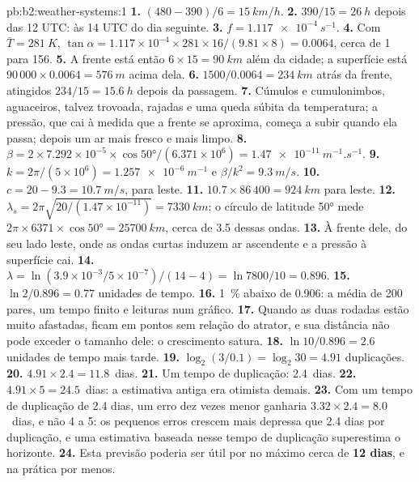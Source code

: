 \begin{solution}{pb:b2:weather-systems:1}
\textbf{1.} $(480 - 390)/6 = \qty{15}{km/h}$.
\textbf{2.} $390/15 = \qty{26}{h}$ depois das 12 UTC: às 14 UTC do dia seguinte.
\textbf{3.} $f = \qty{1.117e-4}{s^{-1}}$.
\textbf{4.} Com $\bar T = \qty{281}{K}$, $\tan\alpha = 1.117 \times 10^{-4} \times 281 \times
16/(9.81 \times 8) = 0.0064$, cerca de 1 para 156.
\textbf{5.} A frente está então $6 \times 15 = \qty{90}{km}$ além da cidade; a superfície está
$90\,000 \times 0.0064 = \qty{576}{m}$ acima dela.
\textbf{6.} $1500/0.0064 = \qty{234}{km}$ atrás da frente, atingidos $234/15 = \qty{15.6}{h}$ depois
da passagem.
\textbf{7.} Cúmulos e cumulonimbos, aguaceiros, talvez trovoada, rajadas e uma queda súbita da
temperatura; a pressão, que cai à medida que a frente se aproxima, começa a subir quando ela passa; depois
um ar mais fresco e mais limpo.
\textbf{8.} $\beta = 2 \times 7.292 \times 10^{-5} \times \cos\ang{50}/(6.371 \times 10^6) =
\qty{1.47e-11}{m^{-1}.s^{-1}}$.
\textbf{9.} $k = 2\pi/(5 \times 10^6) = \qty{1.257e-6}{m^{-1}}$ e $\beta/k^2 = \qty{9.3}{m/s}$.
\textbf{10.} $c = 20 - 9.3 = \qty{10.7}{m/s}$, para leste.
\textbf{11.} $10.7 \times 86\,400 = \qty{924}{km}$ para leste.
\textbf{12.} $\lambda_s = 2\pi\sqrt{20/(1.47 \times 10^{-11})} = \qty{7330}{km}$; o círculo de
latitude \ang{50} mede $2\pi \times 6371 \times \cos\ang{50} = \qty{25700}{km}$, cerca de 3.5
dessas ondas.
\textbf{13.} À frente dele, do seu lado leste, onde as ondas curtas induzem ar ascendente e a
pressão à superfície cai.
\textbf{14.} $\lambda = \ln(3.9 \times 10^{-3}/5 \times 10^{-7})/(14 - 4) = \ln 7800/10 = 0.896$.
\textbf{15.} $\ln 2/0.896 = 0.77$ unidades de tempo.
\textbf{16.} \qty{1}{\percent} abaixo de 0.906: a média de 200 pares, um tempo finito e leituras num
gráfico.
\textbf{17.} Quando as duas rodadas estão muito afastadas, ficam em pontos sem relação do atrator, e
sua distância não pode exceder o tamanho dele: o crescimento satura.
\textbf{18.} $\ln 10/0.896 = 2.6$ unidades de tempo mais tarde.
\textbf{19.} $\log_2(3/0.1) = \log_2 30 = 4.91$ duplicações.
\textbf{20.} $4.91 \times 2.4 = 11.8$~dias.
\textbf{21.} Um tempo de duplicação: 2.4~dias.
\textbf{22.} $4.91 \times 5 = 24.5$~dias: a estimativa antiga era otimista demais.
\textbf{23.} Com um tempo de duplicação de 2.4 dias, um erro dez vezes menor ganharia $3.32 \times 2.4
= 8.0$~dias, e não 4 a 5: os pequenos erros crescem mais depressa que 2.4 dias por duplicação, e uma
estimativa baseada nesse tempo de duplicação superestima o horizonte.
\textbf{24.} Esta previsão poderia ser útil por no máximo cerca de \textbf{12 dias}, e na prática
por menos.
\end{solution}
